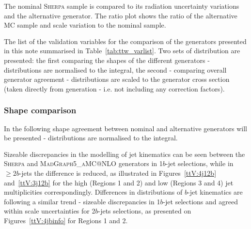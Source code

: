 The nominal  \textsc{Sherpa} \ttW  sample is compared to its radiation uncertainty variations and the alternative generator.
The ratio plot shows the ratio of the alternative MC sample and scale variation to the nominal sample.

The list of the validation variables for the comparison of the \ttW generators presented in this note summarised in Table~\ref{tab:ttw_varlist}.
Two sets of distribution are presented: the first comparing the shapes of the different generators - distributions are normalised to the integral, the second - comparing overall generator agreement - distributions are scaled to the generator cross section (taken directly from generation - i.e. not including any correction factors).

\subsubsection{Shape comparison}
In the following shape agreement between nominal and alternative generators will be presented - distributions are normalised to the integral.

Sizeable discrepancies in the modelling of jet kinematics can be seen between the \textsc{Sherpa} \ttW and \textsc{MadGraph5\_aMC@NLO} generators in 1$b$-jet selections, while in $\geq2b$-jets the difference is reduced, as illustrated in Figures~\ref{ttV:4j12b} and~\ref{ttV:3j12b} for the high (Regions 1 and 2) and low (Regions 3 and 4) jet multiplicities correspondingly. 
Differences in distributions of $b$-jet kinematics are following a similar trend - sizeable discrepancies in 1$b$-jet selections and agreed within scale uncertainties for 2$b$-jets selections, as presented on Figures~\ref{ttV:4jbinfo} for Regions 1 and 2.


